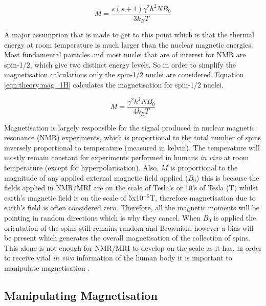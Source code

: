 \documentclass[class=article, crop=false]{standalone}
\begin{document}
\begin{equation}
    M = \frac{s(s+1)\gamma^2 \hbar^2 N B_0}{3k_BT}
    \label{eqn:theory:mag_s}
\end{equation}

A major assumption that is made to get to this point which is that the thermal energy at room temperature is much larger than the nuclear magnetic energies. Most fundamental particles and most nuclei that are of interest for NMR are spin-1/2, which give two distinct energy levels. So in order to simplify the magnetisation calculations only the spin-1/2 nuclei are considered. Equation \ref{eqn:theory:mag_1H} calculates the magnetisation for spin-1/2 nuclei.

\begin{equation}
    M = \frac{\gamma^2 \hbar^2 N B_0}{4k_BT}
    \label{eqn:theory:mag_1H}
\end{equation}

Magnetisation is largely responsible for the signal produced in nuclear magnetic resonance (NMR) experiments, which is proportional to the total number of spins inversely proportional to temperature (measured in kelvin). The temperature will mostly remain constant for experiments performed in humans \textit{in vivo} at room temperature (except for hyperpolarisation). Also, $M$ is proportional to the magnitude of any applied external magnetic field applied ($B_0$) this is because the fields applied in NMR/MRI are on the scale of Tesla's or 10's of Tesla (T) whilst earth's magnetic field is on the scale of 5x10$^{-5}$T, therefore magnetisation due to earth's field is often considered zero. Therefore, all the magnetic moments will be pointing in random directions which is why they cancel. When $B_0$ is applied the orientation of the spins still remains random and Brownian, however a bias will be present which generates the overall magnetisation of the collection of spins. This alone is not enough for NMR/MRI to develop on the scale as it has, in order to receive vital \textit{in vivo} information of the human body it is important to manipulate magnetisation \cite{Haacke2014MagneticDesign}. 

\subsection{Manipulating Magnetisation}
\end{document}
